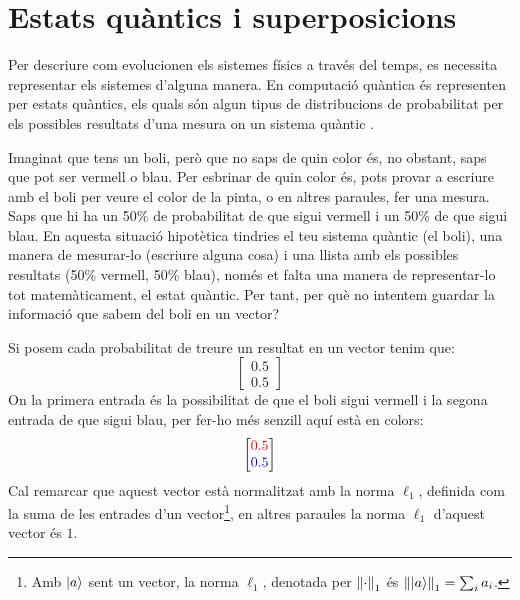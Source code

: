 \section{Estats quàntics i superposicions}
Per descriure com evolucionen els sistemes físics a través del temps, es necessita representar els sistemes d'alguna manera. En computació quàntica és representen per estats quàntics, els quals són algun tipus de distribucions de probabilitat per els possibles resultats d'una mesura on un sistema quàntic \cite{QT_concepts:q_systems}.

Imaginat que tens un boli, però que no saps de quin color és, no obstant, saps que pot ser vermell o blau. Per esbrinar de quin color és, pots provar a escriure amb el boli per veure el color de la pinta, o en altres paraules, fer una mesura. Saps que hi ha un 50\% de probabilitat de que sigui vermell i un 50\% de que sigui blau. En aquesta situació hipotètica tindries el teu sistema quàntic (el boli), una manera de mesurar-lo (escriure alguna cosa) i una llista amb els possibles resultats (50\% vermell, 50\% blau), només et falta una manera de representar-lo tot matemàticament, el estat quàntic. Per tant, per què no intentem guardar la informació que sabem del boli en un vector?

Si posem cada probabilitat de treure un resultat en un vector tenim que:
$$
\begin{bmatrix}
	0.5 \\
	0.5
\end{bmatrix}
$$
On la primera entrada és la possibilitat de que el boli sigui vermell i la segona entrada de que sigui blau, per fer-ho més senzill aquí està en colors:
$$
\begin{bmatrix}
	\textcolor{red}{0.5} \\
	\textcolor{blue}{0.5}
\end{bmatrix}
$$
Cal remarcar que aquest vector està normalitzat amb la norma $\ell_1$, definida com la suma de les entrades d'un vector\footnote{Amb $\ket{a}$ sent un vector, la norma $\ell_1$, denotada per $\norm{\cdot}_1$ és $\norm{\ket{a}}_1 = \sum_i a_i$.}, en altres paraules la norma $\ell_1$ d'aquest vector és $1$.

